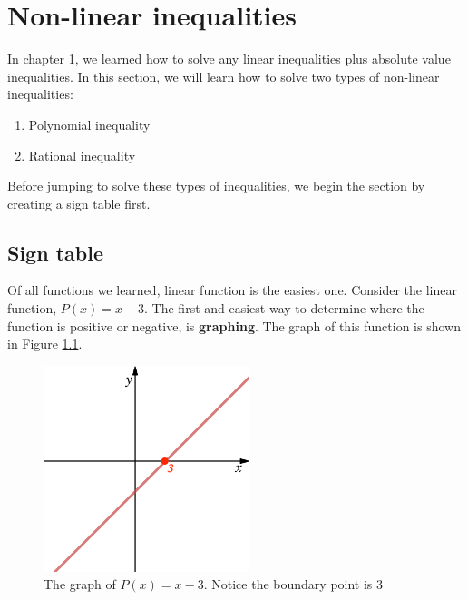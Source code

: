 \chapter{Non-linear inequalities}
In chapter 1, we learned how to solve any linear inequalities plus absolute value inequalities. In this section, we will learn how to solve two types of non-linear inequalities:
\begin{enumerate}
    \item Polynomial inequality
    \item Rational inequality
\end{enumerate}
Before jumping to solve these types of inequalities, we begin the section by creating a sign table first.
\section{Sign table}
Of all functions we learned, linear function is the easiest one. Consider the linear function, $P(x) = x-3$. The first and easiest way to determine where the function is positive or negative, is \textbf{graphing}. The graph of this function is shown in Figure \ref{fig:boundary_point}.\\
\begin{figure}[ht]
    \centering
    \includegraphics[width=6cm]{pics/boundary_point.png}
    \caption{The graph of $P(x)=x-3$. Notice the boundary point is $3$}
    \label{fig:boundary_point}
\end{figure}


